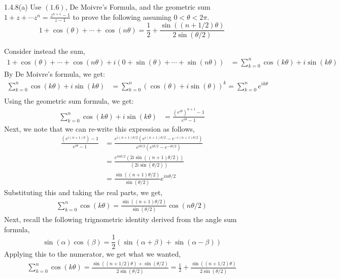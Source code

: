 \documentclass[12pt]{amsart}
\begin{document}
\newpage

\begin{problem}{1.4.8(a)}
    Use $(1.6)$, De Moivre's Formula, and the geometric sum $1+z + \cdots z^n = \frac{z^{n+1}-1}{z-1}$ to prove the following assuming $0 < \theta < 2\pi$. 
    \[ 1 + \cos(\theta) + \cdots + \cos(n\theta) = \frac{1}{2} + \frac{\sin((n+1/2)\theta)}{2\sin(\theta/2)}\]
\end{problem}
\begin{solution}     
    Consider instead the sum, 
    \begin{align*}
        1+\cos(\theta) + \cdots + \cos(n\theta) + i(0+\sin(\theta) + \cdots + \sin(n\theta)) &= \sum_{k = 0}^n \cos(k\theta) + i\sin(k\theta)
    \end{align*}
    By De Moivre's formula, we get:
    \begin{align*}
        \sum_{k = 0}^n \cos(k\theta) + i\sin(k\theta)  &= \sum_{k=0}^n (\cos(\theta) + i\sin(\theta))^k = \sum_{k=0}^n e^{ik\theta}\\
    \end{align*}
    Using the geometric sum formula, we get:
    \begin{align*} 
        \sum_{k = 0}^n \cos(k\theta) + i\sin(k\theta)  &= \frac{(e^{i\theta})^{n+1}-1}{e^{i\theta}-1}
    \end{align*}
    Next, we note that we can re-write this expression as follows, 
    \begin{align*}
        \frac{(e^{i(n+1)\theta})-1}{e^{i\theta}-1} &= \frac{e^{i(n+1)\theta/2}(e^{i(n+1)\theta/2}-e^{-i(n+1)\theta/2})}{e^{i\theta/2}(e^{i\theta/2}-e^{-i\theta/2})} \\
        &= \frac{e^{in\theta/2}(2i\sin((n+1)\theta/2))}{(2i\sin(\theta/2))} \\
        &= \frac{\sin((n+1)\theta/2)}{\sin(\theta/2)}e^{in\theta/2}
\   \end{align*}   
    Substituting this and taking the real parts, we get,
    \begin{align*}
        \sum_{k = 0}^n \cos(k\theta) = \frac{\sin((n+1)\theta/2)}{\sin(\theta/2)}\cos(n\theta/2)
    \end{align*}
    Next, recall the following trignometric identity derived from the angle sum formula,
    \[ \sin(\alpha)\cos(\beta) = \frac{1}{2}\left(\sin(\alpha+\beta)+\sin(\alpha-\beta)\right)\]
    Applying this to the numerator, we get what we wanted,
    \begin{align*}
        \sum_{k = 0}^n \cos(k\theta) = \frac{\sin((n+1/2)\theta)+\sin(\theta/2)}{2\sin(\theta/2)} = \frac{1}{2} + \frac{\sin((n+1/2)\theta)}{2\sin(\theta/2)}
    \end{align*}
\end{solution}
\newpage 
\end{document}
